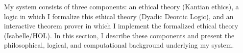 %
\begin{isabellebody}%
%
%
\isadelimtheory
%
\endisadelimtheory
%
\isatagtheory
%
\endisatagtheory
{\isafoldtheory}%
%
\isadelimtheory
%
\endisadelimtheory
%
\isadelimdocument
%
\endisadelimdocument
%
\isatagdocument
%
\isamarkuptrue%
%
\endisatagdocument
{\isafolddocument}%
%
\isadelimdocument
%
\endisadelimdocument
%
\begin{isamarkuptext}%
My system consists of three components: an ethical theory (Kantian ethics), a logic in which
I formalize this ethical theory (Dyadic Deontic Logic), and an interactive theorem prover in which I 
implement the formalized ethical theory (Isabelle/HOL). In this section, I describe these components and 
present the philosophical, logical, and computational background underlying my system. 


\end{isamarkuptext}
\end{isabellebody}
